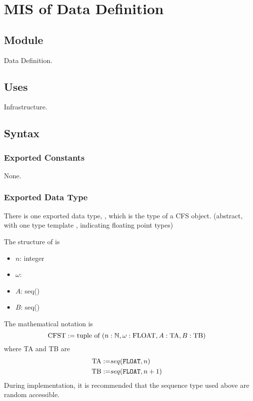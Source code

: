 \documentclass[12pt, titlepage]{article}
\newcommand{\float}{\text{FLOAT}}
\newcommand{\tuple}[1]{\text{tuple of}~(#1)}
\begin{document}
\section{MIS of Data Definition} \label{MIS:DataDef}
\subsection{Module}

Data Definition.

\subsection{Uses}

Infrastructure.

\subsection{Syntax}

\subsubsection{Exported Constants}
None.
\subsubsection{Exported Data Type}
There is one exported data type, , which is the type of a CFS object. (abstract, with one type template , indicating floating point types)

The structure of  is
\begin{itemize}
	\item $n$: integer
	\item $\omega$: 
	\item $A$: seq()
	\item $B$: seq()
\end{itemize}

The mathematical notation is
\begin{equation}
	\text{CFST}:=\tuple{n:\mathbb{N}, \\\omega:\float,\\ A: \text{TA},\\ B:\text{TB}}
\end{equation}
where TA and TB are
\begin{equation}
	\begin{aligned}
	\text{TA}:=&seq(\texttt{FLOAT}, n)\\
	\text{TB}:=&seq(\texttt{FLOAT}, n+1)\\
	\end{aligned}
\end{equation}
During implementation, it is recommended that the sequence type used above are random accessible.
\end{document}
